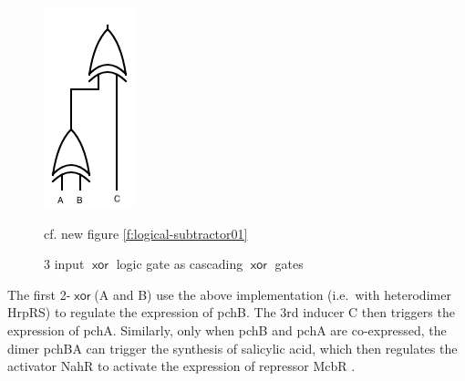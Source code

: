 \documentclass[12pt,notitlepage]{article}
\newcommand{\XOR}{\ensuremath{\mathop{\mathsf{xor}}}\xspace}
\newcommand{\hh}[1]{{\color{Purple}#1}}
\newcommand{\ra}[1]{{\color{Blue}#1}}
\begin{document}
\begin{figure}
    \centering
    \includegraphics{images/circuits/3_input_xor.png}
    \caption{3 input \XOR logic gate as cascading \XOR gates}
    \label{f:my_label}
    \ra{cf. new figure \ref{f:logical-subtractor01}}
\end{figure}

\hh{
The first 2-\XOR (A and B) use the above implementation 
(i.e.~with heterodimer HrpRS) to regulate the expression of pchB. 
%
The 3rd inducer C then triggers the expression of pchA.
%
Similarly, only when pchB and pchA are co-expressed, the dimer pchBA can trigger the synthesis of salicylic acid, which then regulates the activator NahR to activate the expression of repressor McbR \cite{Rey2005}.

}
\end{document}

